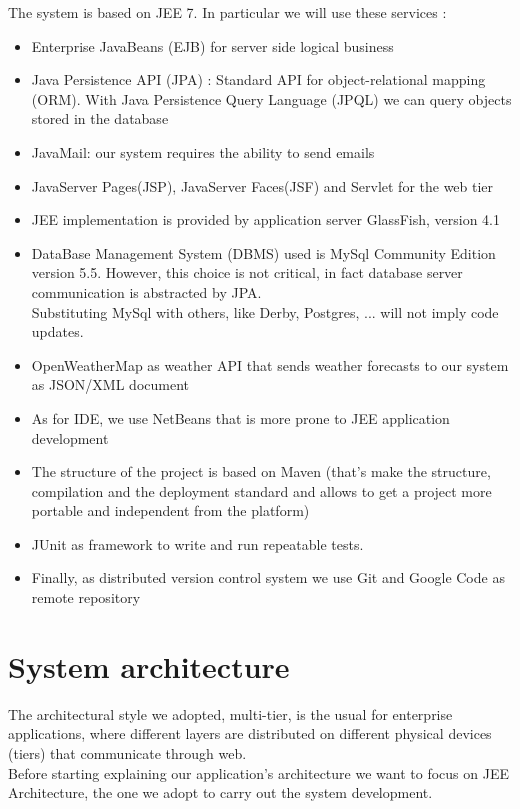 \documentclass[12pt]{book}
\begin{document}
The system is based on JEE 7. In particular we will use these services : 
\begin{itemize}
\item{Enterprise JavaBeans (EJB) for server side logical business  }
\item{Java Persistence API (JPA) : Standard API for object-relational mapping (ORM). With Java Persistence Query Language (JPQL) we can query objects stored in the database}
\item{JavaMail:  our system requires the ability to send emails}
\item{JavaServer Pages(JSP), JavaServer Faces(JSF) and Servlet for the web tier }
\item{JEE implementation is provided by application server GlassFish, version 4.1}
\item{DataBase Management System (DBMS) used is MySql Community Edition version 5.5. However, this choice is not critical, in fact database server communication is abstracted by JPA. \\ Substituting MySql with others, like Derby, Postgres, ... will not imply code updates. }
\item{OpenWeatherMap as weather API that sends weather forecasts to our system as JSON/XML document}
\item{As for IDE, we use NetBeans that is more prone to JEE application development }
\item{The structure of the project is based on Maven (that's make the structure, compilation and the deployment standard and allows to get a project more portable and independent from the platform)}
\item{JUnit as framework to write and run repeatable tests. }
\item{Finally, as distributed version control system we use Git and Google Code as remote repository }
\end{itemize}

\chapter{System architecture}

The architectural style we adopted, multi-tier, is the usual for enterprise applications, where different layers are distributed on different physical devices (tiers) that communicate through web. \\
Before starting explaining our application's architecture we want to focus on JEE Architecture, the one we adopt to carry out the system development.\\
\end{document}
